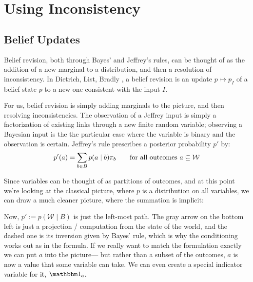 \documentclass{article}
\begin{document}
	\section{Using Inconsistency}	
	\subsection{Belief Updates} \label{sec:belief-update}
	Belief revision, both through Bayes' and Jeffrey's rules, can be thought of as the addition of a new marginal to a distribution, and then a resolution of inconsistency. In Dietrich, List, Bradly \cite{dietrich2016belief}, a belief revision is an update $p \mapsto p_I$ of a belief state $p$ to a new one consistent with the input $I$. 
	
	For us, belief revision is simply adding marginals to the picture, and then resolving inconsistencies. 
	The observation of a Jeffrey input is simply a factorization of existing links through a new finite random variable; observing a Bayesian input is the the particular case where the variable is binary and the observation is certain.
	Jeffrey's rule prescribes a posterior probability $p'$ by:
	\[ p'(a) = \sum_{b \in B} p(a \mid b) \pi_b \qquad \text{for all outcomes $a \subseteq \cal W$} \]
	
	Since variables can be thought of as partitions of outcomes, and at this point we're looking at the classical picture, where $p$ is a distribution on all variables, we can draw a much cleaner picture, where the summation is implicit:
	
	Now, $p' := p(\mathcal W \mid B)$ is just the left-most path. The gray arrow on the bottom left is just a projection / computation from the state of the world, and the dashed one is its inversion given by Bayes' rule, which is why the conditioning works out as in the formula. If we really want to match the formulation exactly we can put $a$ into the picture--- but rather than a subset of the outcomes, $a$ is now a value that some variable can take. We can even create a special indicator variable for it, $\mathbbm 1_a$.
	
\end{document}
